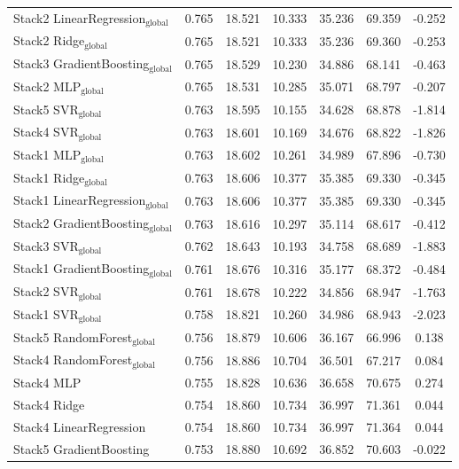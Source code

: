 \begin{table}
{\begin{tabular}{p{4.5cm}cccccc}
        Stack2 LinearRegression$_{\text{global}}$ & 0.765 & 18.521 & 10.333 & 35.236 & 69.359 & -0.252 \\
        Stack2 Ridge$_{\text{global}}$ & 0.765 & 18.521 & 10.333 & 35.236 & 69.360 & -0.253 \\
        Stack3 GradientBoosting$_{\text{global}}$ & 0.765 & 18.529 & 10.230 & 34.886 & 68.141 & -0.463 \\
        Stack2 MLP$_{\text{global}}$ & 0.765 & 18.531 & 10.285 & 35.071 & 68.797 & -0.207 \\
        Stack5 SVR$_{\text{global}}$ & 0.763 & 18.595 & 10.155 & 34.628 & 68.878 & -1.814 \\
        Stack4 SVR$_{\text{global}}$ & 0.763 & 18.601 & 10.169 & 34.676 & 68.822 & -1.826 \\
        Stack1 MLP$_{\text{global}}$ & 0.763 & 18.602 & 10.261 & 34.989 & 67.896 & -0.730 \\
        Stack1 Ridge$_{\text{global}}$ & 0.763 & 18.606 & 10.377 & 35.385 & 69.330 & -0.345 \\
        Stack1 LinearRegression$_{\text{global}}$ & 0.763 & 18.606 & 10.377 & 35.385 & 69.330 & -0.345 \\
        Stack2 GradientBoosting$_{\text{global}}$ & 0.763 & 18.616 & 10.297 & 35.114 & 68.617 & -0.412 \\
        Stack3 SVR$_{\text{global}}$ & 0.762 & 18.643 & 10.193 & 34.758 & 68.689 & -1.883 \\
        Stack1 GradientBoosting$_{\text{global}}$ & 0.761 & 18.676 & 10.316 & 35.177 & 68.372 & -0.484 \\
        Stack2 SVR$_{\text{global}}$ & 0.761 & 18.678 & 10.222 & 34.856 & 68.947 & -1.763 \\
        Stack1 SVR$_{\text{global}}$ & 0.758 & 18.821 & 10.260 & 34.986 & 68.943 & -2.023 \\
        Stack5 RandomForest$_{\text{global}}$ & 0.756 & 18.879 & 10.606 & 36.167 & 66.996 & 0.138 \\
        Stack4 RandomForest$_{\text{global}}$ & 0.756 & 18.886 & 10.704 & 36.501 & 67.217 & 0.084 \\
        Stack4 MLP & 0.755 & 18.828 & 10.636 & 36.658 & 70.675 & 0.274 \\
        Stack4 Ridge & 0.754 & 18.860 & 10.734 & 36.997 & 71.361 & 0.044 \\
        Stack4 LinearRegression & 0.754 & 18.860 & 10.734 & 36.997 & 71.364 & 0.044 \\
        Stack5 GradientBoosting & 0.753 & 18.880 & 10.692 & 36.852 & 70.603 & -0.022 \\

\end{tabular}}
\end{table}

